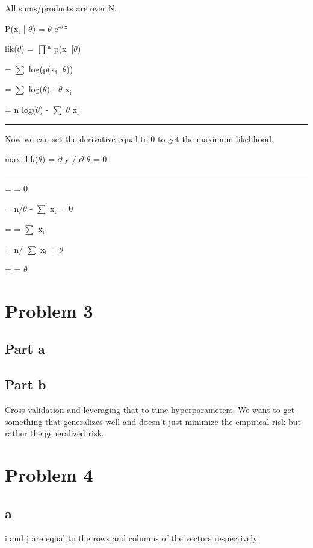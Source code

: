 \documentclass[11pt]{article}
\begin{document}
All sums/products are over N.

P(x$_{\text{i}}$ | $\theta$) = $\theta$ e$^{\text{-}\theta\ \text{x}}$

lik($\theta$) = $\prod$$^{\text{n}}$ p(x$_{\text{i}}$ |$\theta$)

= $\sum$ log(p(x$_{\text{i}}$ |$\theta$))

= $\sum$ log($\theta$) - $\theta$ x$_{\text{i}}$

= n log($\theta$) - $\sum$ $\theta$ x$_{\text{i}}$

\rule{\linewidth}{0.5pt}

Now we can set the derivative equal to 0 to get the maximum likelihood.

max. lik($\theta$) = $\partial$ y / $\partial$ $\theta$ = 0

\rule{\linewidth}{0.5pt}

=  = 0

= n/$\theta$ - $\sum$ x$_{\text{i}}$ = 0

=  = $\sum$ x$_{\text{i}}$

= n/ $\sum$ x$_{\text{i}}$ = $\theta$

=  = $\theta$


\section{Problem 3}
\label{sec-3}
\subsection{Part a}
\label{sec-3-1}
\subsection{Part b}
\label{sec-3-2}
Cross validation and leveraging that to tune hyperparameters. We want to get something that generalizes well and doesn't just minimize the empirical risk but rather the generalized risk.

\section{Problem 4}
\label{sec-4}
\subsection{a}
\label{sec-4-1}
i and j are equal to the rows and columns of the vectors respectively.
\end{document}
